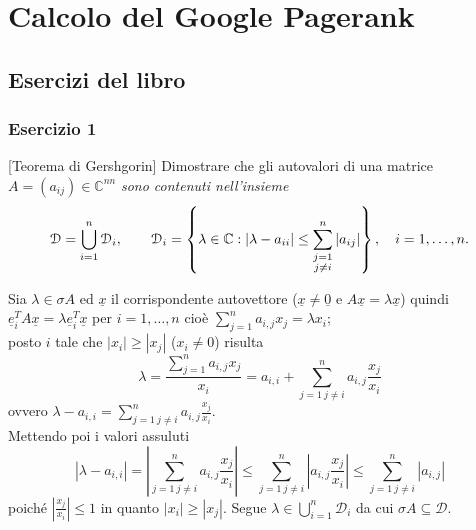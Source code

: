 \chapter{Calcolo del Google Pagerank}
\label{chap:Google}
\section{Esercizi del libro}
\label{sec:Esercizi del libro}

\subsection{Esercizio 1}
\label{sub:Es1}
[Teorema di Gershgorin]
      Dimostrare che gli autovalori di una matrice
      $A=(a_{ij})\in\mathbb{C}^{n n}$
      \emph{sono contenuti nell'insieme}
			\[
				\mathcal{D}=\bigcup_{i=1}^n\mathcal{D}_i,\qquad \mathcal{D}_i=\left\{\lambda\in\mathbb{C}:|\lambda-a_{ii}|\leq\sum_{\begin{subarray}{c}
					j=1\\
					j\neq i
				\end{subarray}}^n|a_{ij}|\right\},\quad i=1,\dots,n.
			\]
\begin{sol}
   Sia $\lambda\in\sigma{A}$ ed $\underline{x}$ il corrispondente autovettore ($\underline{x}\neq\underline{0}$
   e $A\underline{x}=\lambda\underline{x}$) quindi $\underline{e}_i^TA\underline{x}=\lambda\underline{e}_i^T\underline{x}$
   per $i=1,\ldots,n$ cioè $\sum_{j=1}^n{a_{i,j}x_j}=\lambda x_i$;\\
   posto $i$ tale che $|x_i|\geq|x_j|$ ($x_i\neq 0$)
   risulta $$\lambda=\frac{\sum_{j=1}^n{a_{i,j}x_j}}{x_i}=a_{i,i}+\sum_{j=1\: j\neq i}^n{a_{i,j}\frac{x_j}{x_i}}$$ ovvero
   $\lambda-a_{i,i}=\sum_{j=1\: j\neq i}^n{a_{i,j}\frac{x_j}{x_i}}$.\\
   Mettendo poi i valori assuluti
   $$\left|\lambda-a_{i,i}\right|=\left|\sum_{j=1\: j\neq i}^n{a_{i,j}\frac{x_j}{x_i}}\right|\leq\sum_{j=1\: j\neq i}^n{\left|a_{i,j}\frac{x_j}{x_i}\right|}\leq\sum_{j=1\: j\neq i}^n{\left|a_{i,j}\right|}$$ poiché $\left|\frac{x_j}{x_i}\right|\leq 1$
   in quanto $|x_i|\geq|x_j|$. Segue $\lambda\in\bigcup_{i=1}^{n}{\mathcal{D}_i}$ da cui $\sigma{A}\subseteq\mathcal{D}$.
\end{sol}

